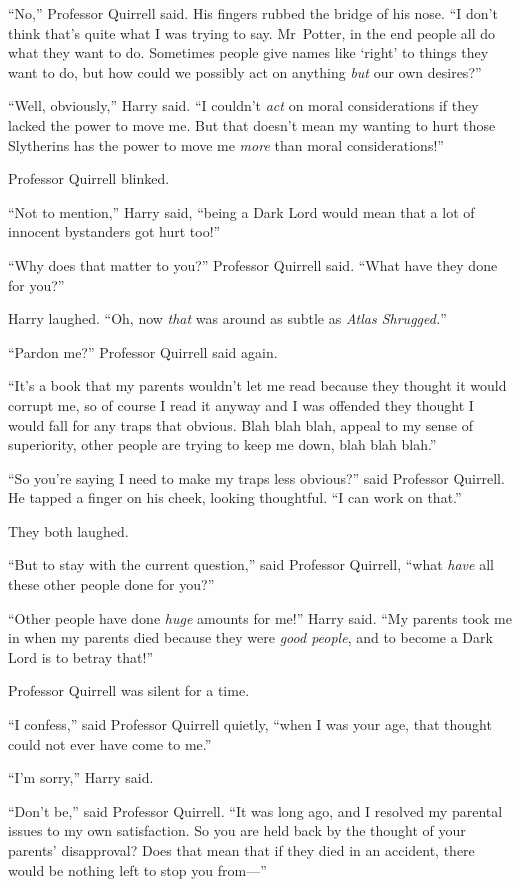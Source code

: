 “No,” Professor Quirrell said. His fingers rubbed the bridge of his nose.
“I don’t think that’s quite what I was trying to say. Mr~Potter, in the end people all do what they want to do. Sometimes people give names like ‘right’ to things they want to do, but how could we possibly act on anything \emph{but} our own desires?”

“Well, obviously,” Harry said.
“I couldn’t \emph{act} on moral considerations if they lacked the power to move me. But that doesn’t mean my wanting to hurt those Slytherins has the power to move me \emph{more} than moral considerations!”

Professor Quirrell blinked.

“Not to mention,” Harry said, “being a Dark Lord would mean that a lot of innocent bystanders got hurt too!”

“Why does that matter to you?” Professor Quirrell said.
“What have they done for you?”

Harry laughed.
“Oh, now \emph{that} was around as subtle as \emph{Atlas Shrugged.}”

“Pardon me?” Professor Quirrell said again.

“It’s a book that my parents wouldn’t let me read because they thought it would corrupt me, so of course I read it anyway and I was offended they thought I would fall for any traps that obvious. Blah blah blah, appeal to my sense of superiority, other people are trying to keep me down, blah blah blah.”

“So you’re saying I need to make my traps less obvious?” said Professor Quirrell. He tapped a finger on his cheek, looking thoughtful.
“I can work on that.”

They both laughed.

“But to stay with the current question,” said Professor Quirrell, “what \emph{have} all these other people done for you?”

“Other people have done \emph{huge} amounts for me!” Harry said.
“My parents took me in when my parents died because they were \emph{good people}, and to become a Dark Lord is to betray that!”

Professor Quirrell was silent for a time.

“I confess,” said Professor Quirrell quietly, “when I was your age, that thought could not ever have come to me.”

“I’m sorry,” Harry said.

“Don’t be,” said Professor Quirrell.
“It was long ago, and I resolved my parental issues to my own satisfaction. So you are held back by the thought of your parents’ disapproval? Does that mean that if they died in an accident, there would be nothing left to stop you from—”

